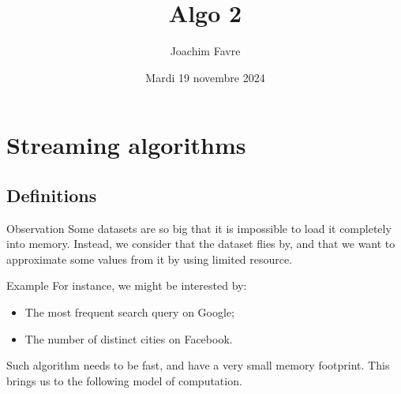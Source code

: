 \documentclass[a4paper]{article}
\title{Algo 2}
\author{Joachim Favre}
\date{Mardi 19 novembre 2024}
\begin{document}
\maketitle


\section{Streaming algorithms}
\subsection{Definitions}

\begin{parag}{Observation}
    Some datasets are so big that it is impossible to load it completely into memory. Instead, we consider that the dataset flies by, and that we want to approximate some values from it by using limited resource.

    \begin{subparag}{Example}
        For instance, we might be interested by:
        \begin{itemize}
            \item The most frequent search query on Google;
            \item The number of distinct cities on Facebook.
        \end{itemize}
        
        Such algorithm needs to be fast, and have a very small memory footprint. This brings us to the following model of computation.
    \end{subparag}
\end{parag}
\end{document}
